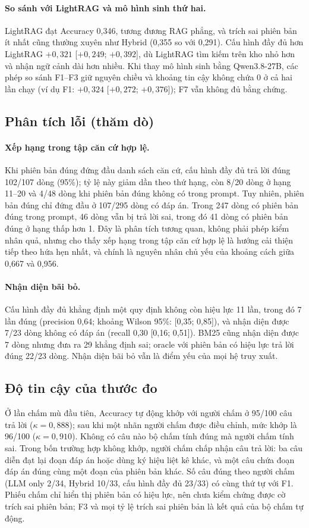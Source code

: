 \documentclass[11pt,a4paper]{article}
\begin{document}
\paragraph{So sánh với LightRAG và mô hình sinh thứ hai.} LightRAG đạt Accuracy 0,346, tương đương RAG phẳng, và trích sai phiên bản ít nhất cũng thường xuyên như Hybrid (0,355 so với 0,291). Cấu hình đầy đủ hơn LightRAG $+0{,}321$ [$+0{,}249$; $+0{,}392$], dù LightRAG tìm kiếm trên kho nhỏ hơn và nhận ngữ cảnh dài hơn nhiều. Khi thay mô hình sinh bằng Qwen3.8-27B, các phép so sánh F1--F3 giữ nguyên chiều và khoảng tin cậy không chứa 0 ở cả hai lần chạy (ví dụ F1: $+0{,}324$ [$+0{,}272$; $+0{,}376$]); F7 vẫn không đủ bằng chứng.

\subsection{Phân tích lỗi (thăm dò)}
\paragraph{Xếp hạng trong tập căn cứ hợp lệ.} Khi phiên bản đúng đứng đầu danh sách căn cứ, cấu hình đầy đủ trả lời đúng 102/107 dòng (95\%); tỷ lệ này giảm dần theo thứ hạng, còn 8/20 dòng ở hạng 11--20 và 4/48 dòng khi phiên bản đúng không có trong prompt. Tuy nhiên, phiên bản đúng chỉ đứng đầu ở 107/295 dòng có đáp án. Trong 247 dòng có phiên bản đúng trong prompt, 46 dòng vẫn bị trả lời sai, trong đó 41 dòng có phiên bản đúng ở hạng thấp hơn 1. Đây là phân tích tương quan, không phải phép kiểm nhân quả, nhưng cho thấy xếp hạng trong tập căn cứ hợp lệ là hướng cải thiện tiếp theo hứa hẹn nhất, và chính là nguyên nhân chủ yếu của khoảng cách giữa 0,667 và 0,956.

\paragraph{Nhận diện bãi bỏ.} Cấu hình đầy đủ khẳng định một quy định không còn hiệu lực 11 lần, trong đó 7 lần đúng (precision 0,64; khoảng Wilson 95\%: [0,35; 0,85]), và nhận diện được 7/23 dòng không có đáp án (recall 0,30 [0,16; 0,51]). BM25 cũng nhận diện được 7 dòng nhưng đưa ra 29 khẳng định sai; oracle với phiên bản có hiệu lực trả lời đúng 22/23 dòng. Nhận diện bãi bỏ vẫn là điểm yếu của mọi hệ truy xuất.

\subsection{Độ tin cậy của thước đo}
Ở lần chấm mù đầu tiên, Accuracy tự động khớp với người chấm ở 95/100 câu trả lời ($\kappa=0{,}888$); sau khi một nhãn người chấm được điều chỉnh, mức khớp là 96/100 ($\kappa=0{,}910$). Không có câu nào bộ chấm tính đúng mà người chấm tính sai. Trong bốn trường hợp không khớp, người chấm chấp nhận câu trả lời: ba câu diễn đạt lại đoạn đáp án hoặc dùng ký hiệu liệt kê khác, và một câu chứa đoạn đáp án đúng cùng một đoạn của phiên bản khác. Số câu đúng theo người chấm (LLM only 2/34, Hybrid 10/33, cấu hình đầy đủ 23/33) có cùng thứ tự với F1. Phiếu chấm chỉ hiển thị phiên bản có hiệu lực, nên chưa kiểm chứng được cờ trích sai phiên bản; F3 và mọi tỷ lệ trích sai phiên bản là kết quả của bộ chấm tự động.
\end{document}
